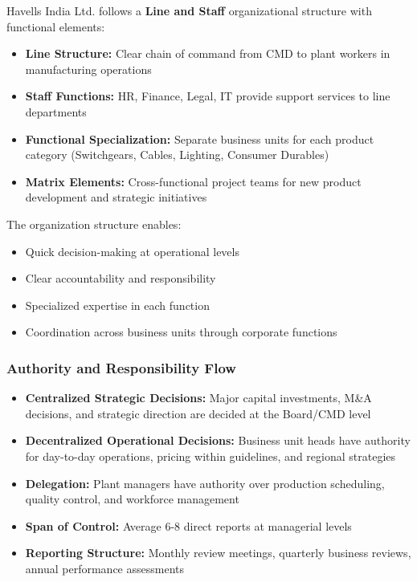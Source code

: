 \documentclass[12pt,a4paper]{article}
\begin{document}
Havells India Ltd. follows a \textbf{Line and Staff} organizational structure with functional elements:

\begin{itemize}[leftmargin=*]
    \item \textbf{Line Structure:} Clear chain of command from CMD to plant workers in manufacturing operations
    \item \textbf{Staff Functions:} HR, Finance, Legal, IT provide support services to line departments
    \item \textbf{Functional Specialization:} Separate business units for each product category (Switchgears, Cables, Lighting, Consumer Durables)
    \item \textbf{Matrix Elements:} Cross-functional project teams for new product development and strategic initiatives
\end{itemize}

The organization structure enables:
\begin{itemize}
    \item Quick decision-making at operational levels
    \item Clear accountability and responsibility
    \item Specialized expertise in each function
    \item Coordination across business units through corporate functions
\end{itemize}

\subsubsection{Authority and Responsibility Flow}

\begin{itemize}[leftmargin=*]
    \item \textbf{Centralized Strategic Decisions:} Major capital investments, M\&A decisions, and strategic direction are decided at the Board/CMD level
    \item \textbf{Decentralized Operational Decisions:} Business unit heads have authority for day-to-day operations, pricing within guidelines, and regional strategies
    \item \textbf{Delegation:} Plant managers have authority over production scheduling, quality control, and workforce management
    \item \textbf{Span of Control:} Average 6-8 direct reports at managerial levels
    \item \textbf{Reporting Structure:} Monthly review meetings, quarterly business reviews, annual performance assessments
\end{itemize}
\end{document}
